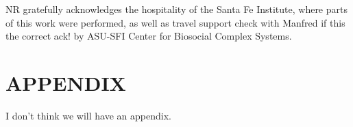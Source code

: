 \documentclass[a4paper,10pt]{article}
\newcommand{\TODO}[1]{\begingroup\color{red}#1\endgroup}
\begin{document}
NR gratefully acknowledges the hospitality of the Santa Fe Institute, where
parts of this work were performed, as well as travel support \TODO{check
  with Manfred if this the correct ack! by ASU-SFI
  Center for Biosocial Complex Systems.}

\vfill

{\small
}

\section*{\uppercase{Appendix}}

\TODO{I don't think we will have an appendix.} 


\vfill
\end{document}
